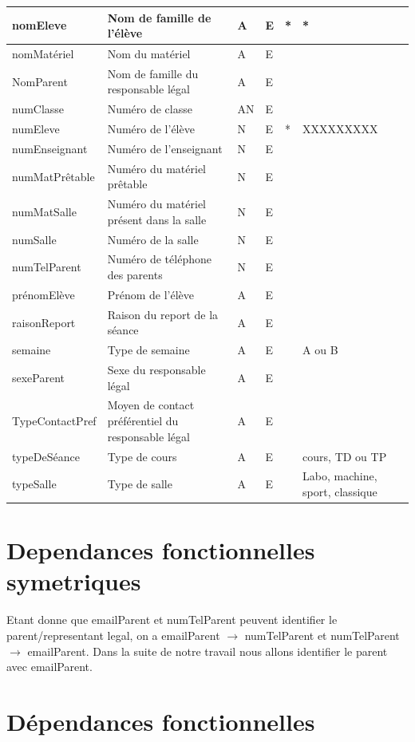 \documentclass[12pt,french,titlepage]{article}
\begin{document}
	  \begin{tabular}{|p{4cm}|p{3cm}|p{1cm}|p{1cm}|p{1cm}|p{2cm}|}
	       nomEleve &	Nom de famille de l'élève &	A &	E &	* &	* \\ \hline
nomMatériel	& Nom du matériel &	A &	E & &		\\ \hline
NomParent &	Nom de famille du responsable légal &	A &	E	& &	\\ \hline
numClasse &	Numéro de classe &	AN &	E	& &	\\ \hline
numEleve &	Numéro de l'élève &	N &	E &	* &	XXXXXXXXX\\ \hline
numEnseignant &	Numéro de l'enseignant &	N &	E & &		\\ \hline
numMatPrêtable &	Numéro du matériel prêtable &	N &	E & &	\\ \hline	
numMatSalle &	Numéro du matériel présent dans la salle &	N &	E & &	\\ \hline	
numSalle &	Numéro de la salle &	N &	E & &		\\ \hline
numTelParent &	Numéro de téléphone des parents &	N &	E & &	\\ \hline	
prénomElève &	Prénom de l'élève &	A &	E & &		\\ \hline
raisonReport &	Raison du report de la séance &	A &	E & &	\\ \hline	
semaine &	Type de semaine &	A &	E & & A ou B		\\ \hline
sexeParent &	Sexe du responsable légal &	A &	E & &	\\ \hline	
TypeContactPref &	Moyen de contact préférentiel du responsable légal &	A &	E & &	\\ \hline	
typeDeSéance &	Type de cours &	A &	E & & cours, TD ou TP		\\ \hline
typeSalle &	Type de salle &	A &	E & & Labo, machine, sport, classique		\\ 
\hline
	  \end{tabular}
	  
	  \section{Dependances fonctionnelles symetriques}
	  
Etant donne que emailParent et numTelParent peuvent identifier le parent/representant legal, on a emailParent $\rightarrow$ numTelParent et numTelParent $\rightarrow$ emailParent. Dans la suite de notre travail nous allons identifier le parent avec emailParent.
	  
	  \section{Dépendances fonctionnelles}
	  
\end{document}
